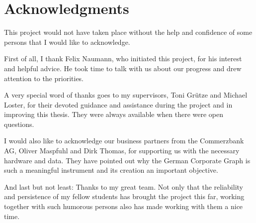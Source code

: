 \section*{Acknowledgments}
This project would not have taken place without the help and confidence of some persons that I would like to acknowledge.

First of all, I thank Felix Naumann, who initiated this project, for his interest and helpful advice. He took time to talk with us about our progress and drew attention to the priorities.

A very special word of thanks goes to my supervisors, Toni Grütze and Michael Loster, for their devoted guidance and assistance during the project and in improving this thesis. They were always available when there were open questions.

I would also like to acknowledge our business partners from the Commerzbank AG, Oliver Maspfuhl and Dirk Thomas, for supporting us with the necessary hardware and data. They have pointed out why the German Corporate Graph is such a meaningful instrument and its creation an important objective.

And last but not least: Thanks to my great team. Not only that the reliability and persistence of my fellow students has brought the project this far, working together with such humorous persons also has made working with them a nice time.